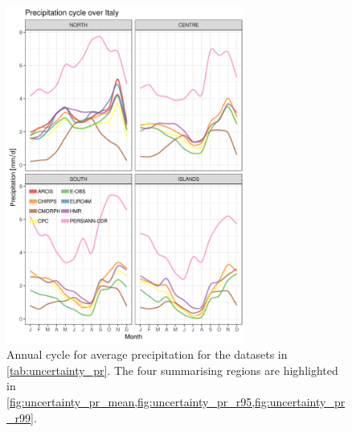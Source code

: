 \begin{figure}
    \centering
        \includegraphics[width=0.7\textwidth]{figures/uncertainty/ac}
    \decoRule
    \caption[Precipitation annual cycle: uncertainty over Italy]{
        Annual cycle for average precipitation for the datasets in \cref{tab:uncertainty_pr}. The four summarising regions are highlighted in \cref{fig:uncertainty_pr_mean,fig:uncertainty_pr_r95,fig:uncertainty_pr_r99}.
} \label{fig:uncertainty_pr_ac}
\end{figure}

